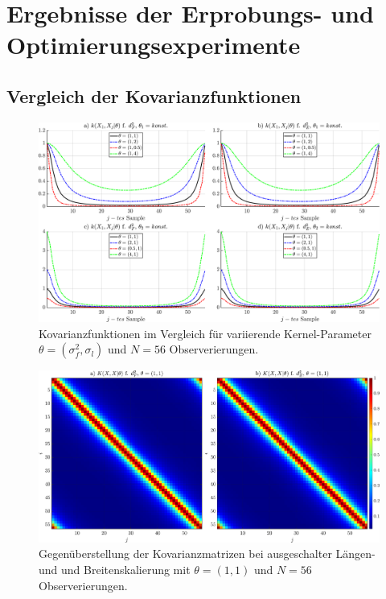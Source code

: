 %

\chapter{Ergebnisse der Erprobungs- und Optimierungsexperimente}\label{ch:results-exp}


\section{Vergleich der Kovarianzfunktionen}\label{sec:ergexp1}


\begin{figure}[tbph]
	\centering
	\includegraphics[width=\linewidth]{appendix/images/8-Ergebnisse-Experimente/Vergleich-Kovarianzfunktionen}
	\caption[Kovarianzfunktionen im Vergleich]{Kovarianzfunktionen im Vergleich für variierende Kernel-Parameter $\theta = (\sigma_f^2, \sigma_l)$ und $N=56$ Observerierungen.}
	\label{fig:vergleich-kovarianzfunktionen}
\end{figure}



\begin{figure}[tbph]
	\centering
	\includegraphics[width=\linewidth]{appendix/images/8-Ergebnisse-Experimente/Vergleich-Kovarianzmatrizen}
	\caption[Gegenüberstellung der Kovarianzmatrizen]{Gegenüberstellung der Kovarianzmatrizen bei ausgeschalter Längen- und und Breitenskalierung mit $\theta = (1,1)$ und $N=56$ Observerierungen.}
	\label{fig:vergleich-kovarianzmatrizen}
\end{figure}


